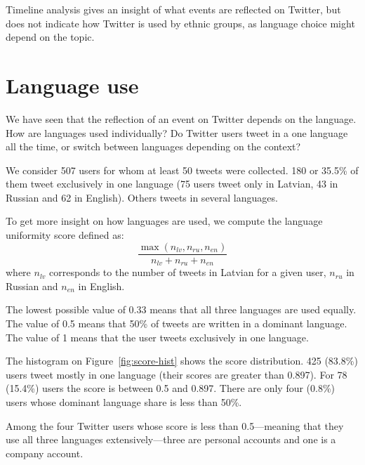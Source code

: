 \documentclass[11pt,a4paper]{article}
\begin{document}

Timeline analysis gives an insight of what events are reflected on Twitter, but does not indicate how Twitter is used by ethnic groups, as language choice might depend on the topic.

\section{Language use}
\label{sec:lang-use}

We have seen that the reflection of an event on Twitter depends on the language. How are languages used individually? Do Twitter users tweet in a one language all the time, or switch between languages depending on the context?

We consider 507 users for whom at least 50 tweets were collected. 180 or 35.5\% of them tweet exclusively in one language (75 users tweet only in Latvian, 43 in Russian and 62 in English). Others tweets in several languages.

To get more insight on how languages are used, we compute the language uniformity score defined as:
\begin{equation}
  \label{eq:score}
  \frac{\max(n_\mathit{lv}, n_\mathit{ru}, n_\mathit{en})}{n_\mathit{lv} + n_\mathit{ru} + n_\mathit{en}}
\end{equation}
where $n_\mathit{lv}$ corresponds to the number of tweets in Latvian for a given user, $n_\mathit{ru}$ in Russian and $n_\mathit{en}$ in English.

The lowest possible value of 0.33 means that all three languages are used equally. The value of 0.5 means that 50\% of tweets are written in a dominant language. The value of 1 means that the user tweets exclusively in one language.

The histogram on Figure~\ref{fig:score-hist} shows the score distribution. 425 (83.8\%) users tweet mostly in one language (their scores are greater than 0.897). For 78  (15.4\%) users the score is between 0.5 and 0.897. There are only four (0.8\%) users whose dominant language share is less than 50\%.

Among the four Twitter users whose score is less than 0.5---meaning that they use all three languages extensively---three are personal accounts and one is a company account.
\end{document}
